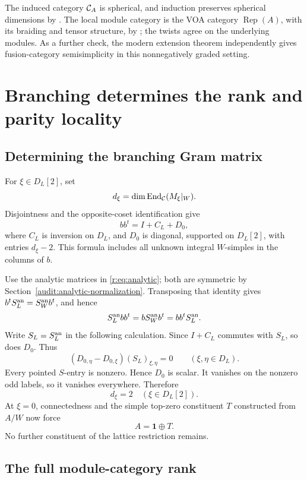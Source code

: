 \documentclass[11pt,a4paper]{article}
\numberwithin{equation}{section}
\theoremstyle{definition}\newtheorem{definition}[theorem]{Definition}
\theoremstyle{remark}\newtheorem{remark}[theorem]{Remark}
\newcommand{\one}{\mathbf1}\newcommand{\B}{\mathcal B}\newcommand{\W}{W_N}
\newcommand{\Rep}{\operatorname{Rep}}\newcommand{\Ext}{\operatorname{Ext}}
\begin{document}
The induced category \(\mathcal C_A\) is spherical, and induction
preserves spherical dimensions by \cite[Theorem 1.18 and
Remark 1.19]{ko}. The local module category is the
VOA category \(\Rep(A)\), with its braiding and tensor structure,
by \cite[Theorem 3.65]{ckm}; the twists agree on the underlying
modules. As a further check, the modern extension theorem
\cite[Theorem 4.10]{cmsy} independently gives fusion-category
semisimplicity in this nonnegatively graded setting.

\section{Branching determines the rank and parity locality}
\label{v2:branching}

\subsection{Determining the branching Gram matrix}

For \(\xi\in D_L[2]\), set
\[
 d_\xi=\dim\operatorname{End}_{\mathcal C}(M_\xi|_W).
\]
Disjointness and the opposite-coset identification give
\begin{equation}\label{r:eq:gram}
 bb^t=I+C_L+D_0,
\end{equation}
where \(C_L\) is inversion on \(D_L\), and \(D_0\) is diagonal,
supported on \(D_L[2]\), with entries \(d_\xi-2\).
This formula includes all unknown integral \(W\)-simples in the
columns of \(b\).

Use the analytic matrices in \eqref{r:eq:analytic}; both are symmetric
by Section~\ref{audit:analytic-normalization}. Transposing that identity
gives $b^tS_L^{\rm an}=S_W^{\rm an}b^t$, and hence
\[
 S_L^{\rm an}bb^t=bS_W^{\rm an}b^t=bb^tS_L^{\rm an}.
\]
Write $S_L=S_L^{\rm an}$ in the following calculation.
Since \(I+C_L\) commutes with \(S_L\), so does \(D_0\).
Thus
\[
 (D_{0,\eta}-D_{0,\xi})(S_L)_{\xi,\eta}=0
                     \qquad(\xi,\eta\in D_L).
\]
Every pointed \(S\)-entry is nonzero. Hence \(D_0\) is scalar.
It vanishes on the nonzero odd labels, so it vanishes everywhere.
Therefore
\[
                         d_\xi=2\quad(\xi\in D_L[2]).
\]
At \(\xi=0\), connectedness and the simple top-zero constituent \(T\)
constructed from \(A/W\) now force
\begin{equation}\label{r:eq:A1T}
                              A=\one\oplus T.
\end{equation}
No further constituent of the lattice restriction remains.

\subsection{The full module-category rank}
\end{document}

